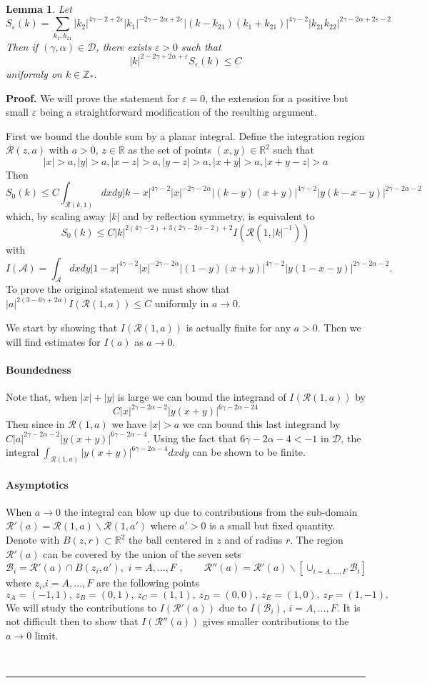\documentclass[a4paper,11pt,reqno]{article}
\newcommand{\eps}{\varepsilon}
\newcommand{\RR}{\mathbb{R}}
\newcommand{\DD}{\mathcal{D}}
\newcommand{\cR}{\mathcal{R}}
\newcommand{\cB}{\mathcal{B}}
\newcommand{\ZZ}{\mathbb{Z}}
\newtheorem{lemma}[theorem]{Lemma}
\newenvironment{proof}[1][Proof]{\textbf{#1.} }{\ \rule{0.5em}{0.5em}}
\begin{document}
\begin{lemma}
\label{lemma:sum-bound}
Let
$$
S_\eps(k) =  \sum_{k_1,k_{21}}   |k_2|^{4\gamma-2+2\eps} |k_1|^{-2\gamma-2\alpha+2\eps}
|(k-k_{21})(k_1+k_{21})|^{4\gamma-2} 
 |k_{21} k_{22}|^{2\gamma-2\alpha+2\eps-2}
$$
Then if $(\gamma,\alpha) \in \DD$, there exists $\eps > 0$ such that
$$
 |k|^{2-2\gamma+2\alpha+\eps} S_{\eps}(k)
 \le C
$$  
uniformly on $k \in \ZZ_*$.
\end{lemma}
\begin{proof}
We will prove the statement for $\eps = 0$, the extension for a positive but small $\eps$ being a straightforward modification of the resulting argument.

First we bound the double sum by a planar integral. Define the integration region $\cR(z,a)$ with $a>0$, $z\in\RR$ as the set of points $(x,y) \in \RR^2$ such that
$$
|x|>a, |y| > a, |x-z|>a, |y-z|>a, |x+y|>a, |x+y-z|>a
$$
Then 
$$
S_0(k) \le C \int_{\cR(k,1)} dx dy |k-x|^{4\gamma-2} |x|^{-2\gamma-2\alpha}
|(k-y)(x+y)|^{4\gamma-2} 
 |y (k-x-y)|^{2\gamma-2\alpha-2}
$$
which, by scaling away $|k|$ and by reflection symmetry, is equivalent to
$$
S_0(k) \le C |k|^{2(4\gamma-2)+3(2\gamma-2\alpha-2)+2} I(\cR(1,|k|^{-1}))
$$
with
$$
I(\mathcal{A}) =
\int_{\mathcal{A}} dx dy |1-x|^{4\gamma-2} |x|^{-2\gamma-2\alpha}
|(1-y)(x+y)|^{4\gamma-2} 
 |y (1-x-y)|^{2\gamma-2\alpha-2}.
$$
To prove the original statement we must show that
$
|a|^{2(3-6\gamma+2\alpha)} I(\cR(1,a)) \le C
$ uniformly in $a \to 0$.

We start by showing that $I(\cR(1,a))$ is actually finite for any $a > 0$. Then we will find estimates for $I(a)$ as $a \to 0$.

\paragraph{Boundedness}
Note that, when $|x|+|y|$ is large we can bound the integrand of $I(\cR(1,a))$ by
$$
C |x|^{2\gamma-2\alpha-2}
|y(x+y)|^{6\gamma-2\alpha-24}
$$
Then since in $\cR(1,a)$ we have $|x|>a$ we can bound this last integrand by
$C |a|^{2\gamma-2\alpha-2}
|y(x+y)|^{6\gamma-2\alpha-4}$. Using the fact  that $6\gamma-2\alpha-4 < -1$ in $\DD$, the integral
$
\int_{\cR(1,a)} |y(x+y)|^{6\gamma-2\alpha-4} dx dy
$ can be shown to be finite.

\paragraph{Asymptotics} When $a \to 0$ the integral can blow up due to contributions from the sub-domain $\cR'(a) = \cR(1,a) \backslash \cR(1,a')$ where $a'>0$ is a small but fixed quantity.  Denote with $B(z,r) \subset \RR^2$ the ball  centered in $z$ and of radius $r$. The region $\cR'(a)$ can be covered by the union of the  seven sets 
$$
\cB_i = \cR'(a) \cap B(z_i, a'),\,\, i=A,\dots,F\,\,, \qquad \cR''(a) = \cR'(a)\backslash \left[\cup_{i=A,\dots,F} \cB_i \right]
$$
where $z_i$,$i=A,\dots,F$ are the following points
$$
z_A = (-1,1),\, z_B = (0,1),\, z_C=(1,1),\, z_D=(0,0),\, z_E=(1,0),\, z_F=(1,-1).
$$
We will study the contributions to $I(\cR'(a))$ due to $I(\cB_i)$, $i=A,\dots,F$. It is not difficult then to show that $I(\cR''(a))$ gives smaller contributions to the $a\to 0$ limit.


\end{proof}
\end{document}
